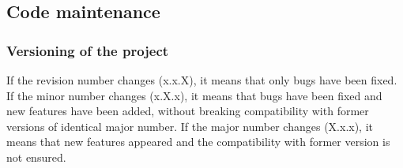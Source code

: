 \documentclass{article}
\begin{document}


    
    \subsection{Code maintenance}
    \subsubsection{Versioning of the project}
    If the revision number changes (x.x.X), it means that only bugs have been fixed.
    If the minor number changes (x.X.x), it means that bugs have been fixed and new features have been added, without breaking compatibility with former versions of identical major number.
    If the major number changes (X.x.x), it means that new features appeared and the compatibility with former version is not ensured.
\end{document}
